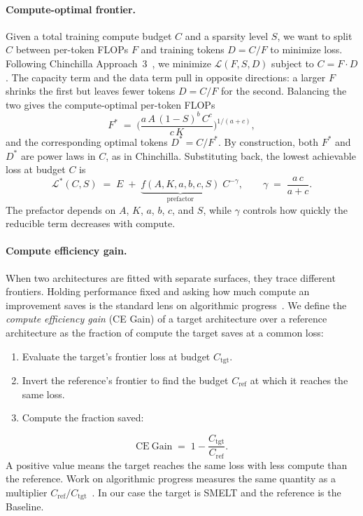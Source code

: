 \documentclass[]{bytedance_seed}
\newcommand{\archname}{SMELT}
\theoremstyle{definition}
\theoremstyle{remark}
\begin{document}
\paragraph{Compute-optimal frontier.}
%
Given a total training compute budget $C$ and a sparsity level $S$, we want to split $C$ between per-token FLOPs $F$ and training tokens $D = C / F$ to minimize loss.
%
Following Chinchilla Approach~3~\cite{hoffmann2022training}, we minimize $\mathcal{L}(F, S, D)$ subject to $C = F \cdot D$.
%
The capacity term and the data term pull in opposite directions: a larger $F$ shrinks the first but leaves fewer tokens $D = C/F$ for the second.
%
Balancing the two gives the compute-optimal per-token FLOPs
%
\begin{equation}
\label{eq:f-star}
F^{*}
\;=\;
\Biggl(
\frac{a\, A\, (1-S)^{b}\,
      C^{c}}
{c\, K}
\Biggr)^{1/(a+c)},
\end{equation}
and the corresponding optimal tokens $D^{*} = C / F^{*}$.
%
By construction, both $F^{*}$ and $D^{*}$ are power laws in $C$, as in Chinchilla.
%
Substituting back, the lowest achievable loss at budget $C$ is
%
\begin{equation}
\label{eq:frontier}
\mathcal{L}^{*}(C, S)
\;=\;
E \;+\; \underbrace{f(A, K, a, b, c, S)}_{\text{prefactor}}\; C^{-\gamma},
\qquad
\gamma \;=\; \frac{a\,c}{a + c}.
\end{equation}
%
The prefactor depends on $A$, $K$, $a$, $b$, $c$, and $S$, while $\gamma$ controls how quickly the reducible term decreases with compute.
%

\paragraph{Compute efficiency gain.}
%
When two architectures are fitted with separate surfaces, they trace different frontiers.
%
Holding performance fixed and asking how much compute an improvement saves is the standard lens on algorithmic progress~\cite{hernandez2020measuring}.
%
We define the \textit{compute efficiency gain} (CE Gain) of a target architecture over a reference architecture as the fraction of compute the target saves at a common loss:
%
\begin{enumerate}
\item Evaluate the target's frontier loss at budget $C_{\mathrm{tgt}}$.
%
\item Invert the reference's frontier to find the budget $C_{\mathrm{ref}}$ at which it reaches the same loss.
%
\item Compute the fraction saved:
%
\end{enumerate}
\begin{equation}
\label{eq:ce-gain}
\mathrm{CE\ Gain}
\;=\;
1 - \frac{C_{\mathrm{tgt}}}{C_{\mathrm{ref}}}.
\end{equation}
A positive value means the target reaches the same loss with less compute than the reference.
%
Work on algorithmic progress measures the same quantity as a multiplier $C_{\mathrm{ref}}/C_{\mathrm{tgt}}$~\cite{davidson2023ceg,ho2024algorithmic}.
%
In our case the target is \archname{} and the reference is the Baseline.
%
\end{document}
